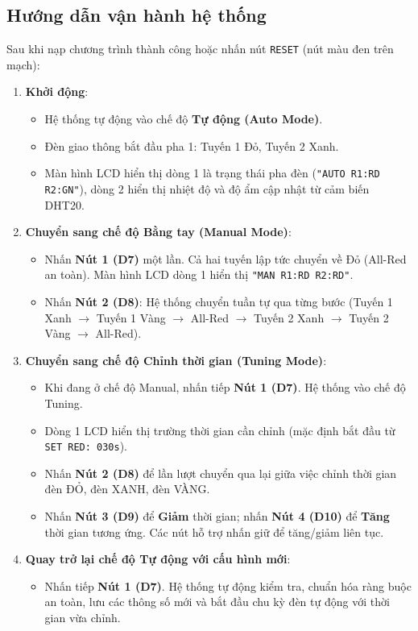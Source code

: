 \subsection{Hướng dẫn vận hành hệ thống}
Sau khi nạp chương trình thành công hoặc nhấn nút \texttt{RESET} (nút màu đen trên mạch):
\begin{enumerate}
    \item \textbf{Khởi động}:
    \begin{itemize}
        \item Hệ thống tự động vào chế độ \textbf{Tự động (Auto Mode)}.
        \item Đèn giao thông bắt đầu pha 1: Tuyến 1 Đỏ, Tuyến 2 Xanh.
        \item Màn hình LCD hiển thị dòng 1 là trạng thái pha đèn (\texttt{"AUTO R1:RD R2:GN"}), dòng 2 hiển thị nhiệt độ và độ ẩm cập nhật từ cảm biến DHT20.
    \end{itemize}
    \item \textbf{Chuyển sang chế độ Bằng tay (Manual Mode)}:
    \begin{itemize}
        \item Nhấn \textbf{Nút 1 (D7)} một lần. Cả hai tuyến lập tức chuyển về Đỏ (All-Red an toàn). Màn hình LCD dòng 1 hiển thị \texttt{"MAN  R1:RD R2:RD"}.
        \item Nhấn \textbf{Nút 2 (D8)}: Hệ thống chuyển tuần tự qua từng bước (Tuyến 1 Xanh $\rightarrow$ Tuyến 1 Vàng $\rightarrow$ All-Red $\rightarrow$ Tuyến 2 Xanh $\rightarrow$ Tuyến 2 Vàng $\rightarrow$ All-Red).
    \end{itemize}
    \item \textbf{Chuyển sang chế độ Chỉnh thời gian (Tuning Mode)}:
    \begin{itemize}
        \item Khi đang ở chế độ Manual, nhấn tiếp \textbf{Nút 1 (D7)}. Hệ thống vào chế độ Tuning.
        \item Dòng 1 LCD hiển thị trường thời gian cần chỉnh (mặc định bắt đầu từ \texttt{SET RED:  030s}).
        \item Nhấn \textbf{Nút 2 (D8)} để lần lượt chuyển qua lại giữa việc chỉnh thời gian đèn ĐỎ, đèn XANH, đèn VÀNG.
        \item Nhấn \textbf{Nút 3 (D9)} để \textbf{Giảm} thời gian; nhấn \textbf{Nút 4 (D10)} để \textbf{Tăng} thời gian tương ứng. Các nút hỗ trợ nhấn giữ để tăng/giảm liên tục.
    \end{itemize}
    \item \textbf{Quay trở lại chế độ Tự động với cấu hình mới}:
    \begin{itemize}
        \item Nhấn tiếp \textbf{Nút 1 (D7)}. Hệ thống tự động kiểm tra, chuẩn hóa ràng buộc an toàn, lưu các thông số mới và bắt đầu chu kỳ đèn tự động với thời gian vừa chỉnh.
    \end{itemize}
\end{enumerate}
